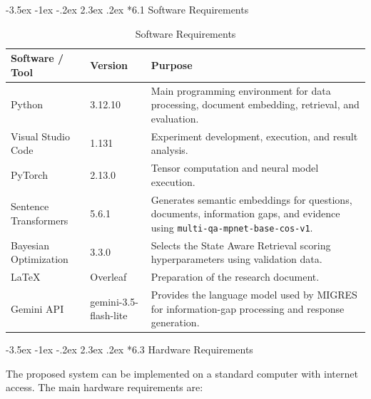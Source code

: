\documentclass[12pt,a4paper]{report}
\makeatletter
\renewcommand\section{\@startsection{section}{1}{\z@}%
    {-3.5ex \@plus -1ex \@minus -.2ex}%
    {2.3ex \@plus.2ex}%
    {\normalfont\fontsize{16}{19}\selectfont\bfseries}}
\makeatother
\begin{document}
\section*{6.1 Software Requirements}

\begin{table}[H]
\centering
\caption{Software Requirements}
\label{tab:software-requirements}
\renewcommand{\arraystretch}{1.2}
\begin{tabular}{|p{1.65in}|p{1.45in}|p{2.95in}|}
\hline
\textbf{Software / Tool} & \textbf{Version} & \textbf{Purpose} \\ \hline

Python & 3.12.10 &
Main programming environment for data processing, document embedding,
retrieval, and evaluation. \\ \hline

Visual Studio Code & 1.131 &
Experiment development, execution, and result analysis. \\ \hline

PyTorch \cite{paszke2019pytorch} & 2.13.0 &
Tensor computation and neural model execution. \\ \hline

Sentence Transformers \cite{reimers2019sentence} & 5.6.1 &
Generates semantic embeddings for questions, documents, information
gaps, and evidence using
\texttt{multi-qa-mpnet-base-cos-v1}. \\ \hline

Bayesian Optimization \cite{nogueira2014bayesopt} & 3.3.0 &
Selects the State Aware Retrieval scoring hyperparameters using
validation data. \\ \hline

LaTeX & Overleaf &
Preparation of the research document. \\ \hline

Gemini API \cite{gemini2023} & gemini-3.5-flash-lite &
Provides the language model used by MIGRES for information-gap
processing and response generation. \\ \hline

\end{tabular}
\end{table}
\clearpage
\section*{6.3 Hardware Requirements}

The proposed system can be implemented on a standard computer
with internet access. The main hardware requirements are:
\end{document}
